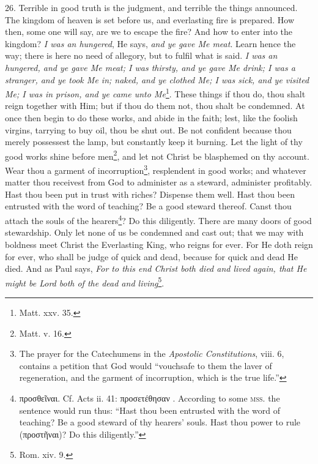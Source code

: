 26. Terrible in good truth is the judgment, and terrible the things announced. The kingdom of heaven is set before us, and everlasting fire is prepared. How then, some one will say, are we to escape the fire? And how to enter into the kingdom? \emph{I was an hungered}, He says, \emph{and ye gave Me meat}. Learn hence the way; there is here no need of allegory, but to fulfil what is said. \emph{I was an hungered, and ye gave Me meat; I was thirsty, and ye gave Me drink; I was a stranger, and ye took Me in; naked, and ye clothed Me; I was sick, and ye visited Me; I was in prison, and ye came unto Me}\footnote{Matt. xxv. 35.}. These things if thou do, thou shalt reign together with Him; but if thou do them not, thou shalt be condemned. At once then begin to do these works, and abide in the faith; lest, like the foolish virgins, tarrying to buy oil, thou be shut out. Be not confident because thou merely possessest the lamp, but constantly keep it burning. Let the light of thy good works shine before men\footnote{Matt. v. 16.}, and let not Christ be blasphemed on thy account. Wear thou a garment of incorruption\footnote{The prayer for the Catechumens in the \emph{Apostolic Constitutions}, viii. 6, contains a petition that God would “vouchsafe to them the laver of regeneration, and the garment of incorruption, which is the true life.”}, resplendent in good works; and whatever matter thou receivest from God to administer as a steward, administer profitably. Hast thou been put in trust with riches? Dispense them well. Hast thou been entrusted with the word of teaching? Be a good steward thereof. Canst thou attach the souls of the hearers\footnote{\textgreek{προσθεῖναι}. Cf. Acts ii. 41: \textgreek{προσετέθησαν} . According to some \textsc{mss.} the sentence would run thus: “Hast thou been entrusted with the word of teaching? Be a good steward of thy hearers’ souls. Hast thou power to rule (\textgreek{προστῆναι})? Do this diligently.”}? Do this diligently. There are many doors of good stewardship. Only let none of us be condemned and cast out; that we may with boldness meet Christ the Everlasting King, who reigns for ever. For He doth reign for ever, who shall be judge of quick and dead, because for quick and dead He died. And as Paul says, \emph{For to this end Christ both died and lived again, that He might be Lord both of the dead and living}\footnote{Rom. xiv. 9.}.

